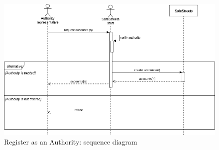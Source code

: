 \documentclass{article}
\begin{document}
\begin{figure}
		\centering
		\includegraphics[width=\linewidth]{Images/Register_authority_sequence_diagram.png}
		\caption{Register as an Authority: sequence diagram}
	\end{figure}
	
\end{document}
